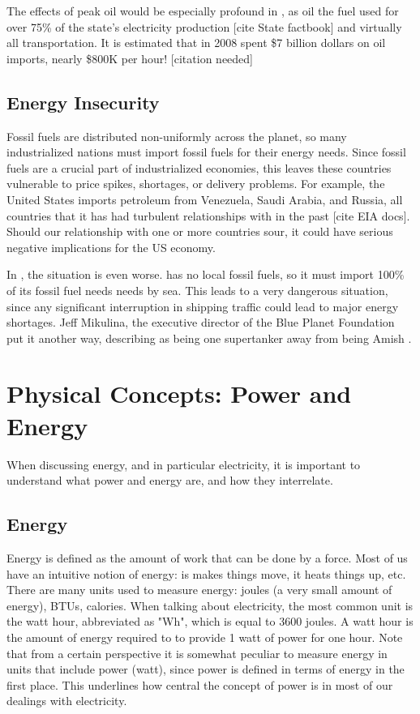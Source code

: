 The effects of peak oil would be especially profound in \Hawaii, as oil the fuel used for over 75\% of the state's electricity production [cite State factbook] and virtually all transportation. It is estimated that in 2008 \Hawaii spent \$7 billion dollars on oil imports, nearly \$800K per hour! [citation needed]

\subsection{Energy Insecurity}

Fossil fuels are distributed non-uniformly across the planet, so many industrialized nations must import fossil fuels for their energy needs. Since fossil fuels are a crucial part of industrialized economies, this leaves these countries vulnerable to price spikes, shortages, or delivery problems. For example, the United States imports petroleum from Venezuela, Saudi Arabia, and Russia, all countries that it has had turbulent relationships with in the past [cite EIA docs]. Should our relationship with one or more countries sour, it could have serious negative implications for the US economy.

In \Hawaii, the situation is even worse. \Hawaii has no local fossil fuels, so it must import 100\% of its fossil fuel needs needs by sea. This leads to a very dangerous situation, since any significant interruption in shipping traffic could lead to major energy shortages. Jeff Mikulina, the executive director of the Blue Planet Foundation put it another way, describing \Hawaii as being one supertanker away from being Amish \cite{nyt2008HawaiiMoonShot}.

\section{Physical Concepts: Power and Energy}

When discussing energy, and in particular electricity, it is important to understand what power and energy are, and how they interrelate.

\subsection{Energy}

Energy is defined as the amount of work that can be done by a force. Most of us have an intuitive notion of energy: is makes things move, it heats things up, etc. There are many units used to measure energy: joules (a very small amount of energy), BTUs, calories. When talking about electricity, the most common unit is the watt hour, abbreviated as "Wh", which is equal to 3600 joules. A watt hour is the amount of energy required to to provide 1 watt of power for one hour. Note that from a certain perspective it is somewhat peculiar to measure energy in units that include power (watt), since power is defined in terms of energy in the first place. This underlines how central the concept of power is in most of our dealings with electricity.

